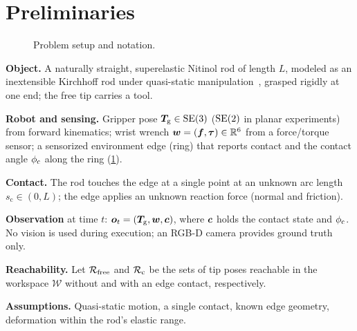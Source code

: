 \section{Preliminaries}
\label{sec:Preliminaries}

\begin{figure}[t]
  \centering
  \caption{Problem setup and notation.}
  \label{fig:notation}
\end{figure}

\begin{outline}
  \item \textbf{Object.} A naturally straight, superelastic Nitinol rod of
    length $L$, modeled as an inextensible Kirchhoff rod under quasi-static
    manipulation~\cite{bretl2014quasistatic}, grasped rigidly at one end; the
    free tip carries a tool. 
  \item \textbf{Robot and sensing.} Gripper pose $\bm{T}_{\mathrm{g}}\in\mathrm{SE}(3)$ ($\mathrm{SE}(2)$
    in planar experiments) from forward kinematics; wrist wrench
    $\bm{w}=(\bm{f},\bm{\tau})\in\mathbb{R}^{6}$ from a force/torque sensor; a
    sensorized environment edge (ring) that reports contact and the contact
    angle $\phi_{\mathrm{c}}$ along the ring (\cref{fig:notation}).
  \item \textbf{Contact.} The rod touches the edge at a single point at an
    unknown arc length $s_{\mathrm{c}}\in(0,L)$; the edge applies an unknown
    reaction force (normal and friction). 
  \item \textbf{Observation} at time $t$: $\bm{o}_t=(\bm{T}_{\mathrm{g}},\bm{w},\bm{c})$,
    where $\bm{c}$ holds the contact state and $\phi_{\mathrm{c}}$. No vision is used during
    execution; an RGB-D camera provides ground truth only.
  \item \textbf{Reachability.} Let $\mathcal{R}_{\mathrm{free}}$ and $\mathcal{R}_{\mathrm{c}}$ be the sets of tip
    poses reachable in the workspace $\mathcal{W}$ without and with an edge
    contact, respectively.
  \item \textbf{Assumptions.} Quasi-static motion, a single contact, known edge
    geometry, deformation within the rod's elastic range.
\end{outline}

